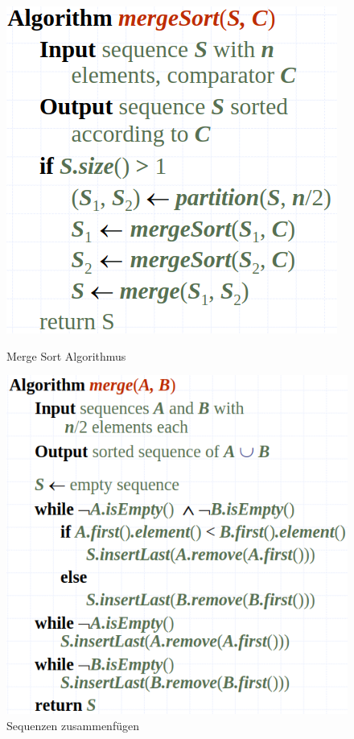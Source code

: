 \begin{figure}[h!]
	\centering
	\begin{minipage}[t]{0.4\textwidth}
		\centering
		\includegraphics[width=0.7\linewidth]{images/merge_sort_alg}
		\caption{Merge Sort Algorithmus}
		\label{fig:mergesortalg}
	\end{minipage}
	\begin{minipage}[t]{0.4\textwidth}
		\centering
		\includegraphics[width=0.9\linewidth]{images/merge_sort_merge}
		\caption{Sequenzen zusammenfügen}
		\label{fig:mergesortmergen}
	\end{minipage}
\end{figure}


